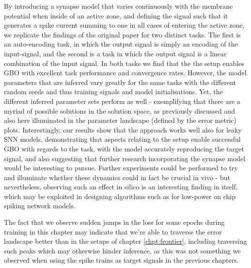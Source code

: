 \documentclass[mphil,deptreport,ianc]{infthesis} %
\begin{document}
By introducing a synapse model that varies continuously with the membrane potential when inside of an active zone, and defining the signal such that it generates a spike current summing to one in all cases of entering the active zone, we replicate the findings of the original paper \cite{Huh2018} for two distinct tasks.
The first is an auto-encoding task, in which the output signal is simply an encoding of the input-signal, and the second is a task in which the output signal is a linear combination of the input signal.
In both tasks we find that the the setup enables GBO with excellent task performance and convergence rates.
However, the model parameters that are inferred vary greatly for the same tasks with the different random seeds and thus training signals and model initialisations.
Yet, the different inferred parameter sets perform as well - exemplifying that there are a myriad of possible solutions in the solution space, as previously discussed and also here illuminated in the parameter landscape (defined by the error metric) plots.
Interestingly, our results show that the approach works well also for leaky SNN models, demonstrating that aspects relating to the setup enable successful GBO with regards to the task, with the model accurately reproducing the target signal, and also suggesting that further research incorporating the synapse model would be interesting to pursue.
Further experiments could be performed to try and illuminate whether these dynamics could in fact be crucial in vivo - but nevertheless, observing such an effect in silico is an interesting finding in itself, which may be exploited in designing algorithms such as for low-power on chip spiking network models.

The fact that we observe sudden jumps in the loss for some epochs during training in this chapter may indicate that we're able to traverse the error landscape better than in the setups of chapter \ref{chpt:frontier}, including traversing such peaks which may otherwise hinder inference, as this was not something we observed when using the spike trains as target signals in the previous chapters.
\end{document}
